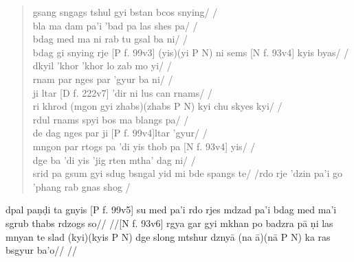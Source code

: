 \documentclass[naipra.tex]{subfiles}
\begin{document}
\begin{quote}
	gsang sngags tshul gyi bstan bcos snying/ /\\
	bla ma dam pa'i 'bad pa las shes pa/ /\\
	bdag med ma ni rab tu gsal ba ni/ /\\
	bdag gi snying rje [P f. 99v3] (yis)(yi P N) ni sems [N f. 93v4] kyis byas/ /\\

	dkyil 'khor 'khor lo zab mo yi/ /\\
	rnam par nges par 'gyur ba ni/ /\\
	ji ltar [D f. 222v7] 'dir ni lus can rnams/ /\\
	ri khrod (mgon gyi zhabs)(zhabs P N) kyi chu skyes kyi/ /\\
	rdul rnams spyi bos ma blangs pa/ /\\
	de dag nges par ji [P f. 99v4]ltar 'gyur/ /\\

	mngon par rtogs pa 'di yis thob pa [N f. 93v4] yis/ /\\
	dge ba 'di yis 'jig rten mtha' dag ni/ /\\
	srid pa gsum gyi sdug bsngal yid mi bde spangs te/ /\newline
	[D f. 223r1] rdo rje 'dzin pa'i go 'phang rab gnas shog /\\
\end{quote}

dpal paṇḍi ta gnyis [P f. 99v5] su med pa'i rdo rjes mdzad pa'i bdag med ma'i sgrub thabs rdzogs so// //[N f. 93v6] rgya gar gyi mkhan po badzra pā ṇi las mnyan te slad (kyi)(kyis P N) dge slong mtshur dznyā (na ā)(nā P N) ka ras bsgyur ba'o// // 
\end{document}
